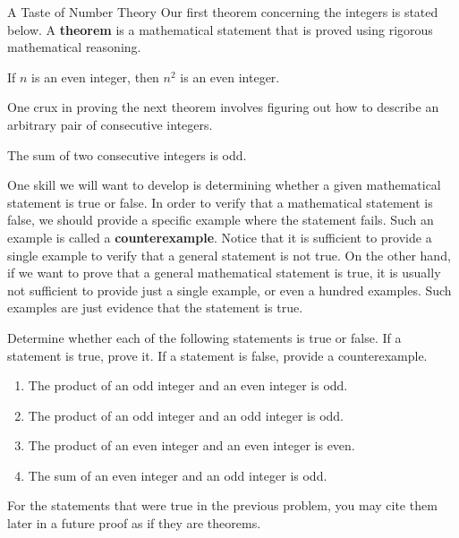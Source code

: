 \begin{section}{A Taste of Number Theory}
Our first theorem concerning the integers is stated below.  A \textbf{theorem} is a mathematical statement that is proved using rigorous mathematical reasoning. 

\begin{theorem}\label{thm:n even implies n^2 even}
If $n$ is an even integer, then $n^2$ is an even integer.
\end{theorem}

One crux in proving the next theorem involves figuring out how to describe an arbitrary pair of consecutive integers.

\begin{theorem}\label{thm:two consecutive ints}
The sum of two consecutive integers is odd.
\end{theorem}

One skill we will want to develop is determining whether a given mathematical statement is true or false.  In order to verify that a mathematical statement is false, we should provide a specific example where the statement fails. Such an example is called a \textbf{counterexample}.  Notice that it is sufficient to provide a single example to verify that a general statement is not true.  On the other hand, if we want to prove that a general mathematical statement is true, it is usually not sufficient to provide just a single example, or even a hundred examples.  Such examples are just evidence that the statement is true.

\begin{problem}
Determine whether each of the following statements is true or false.  If a statement is true, prove it. If a statement is false, provide a counterexample.
\begin{enumerate}[label=\textrm{(\alph*)}]
\item The product of an odd integer and an even integer is odd.
\item The product of an odd integer and an odd integer is odd.
\item The product of an even integer and an even integer is even.
\item The sum of an even integer and an odd integer is odd.
\end{enumerate}
\end{problem}

For the statements that were true in the previous problem, you may cite them later in a future proof as if they are theorems.



\end{section}
